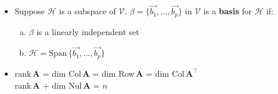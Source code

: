\documentclass[11pt]{article}
\newcommand{\Def}{\fbox{Def}}
\newcommand{\A}{\mathbf{A}}
\begin{document}
\begin{itemize}
\item[\Def] Suppose $\mathcal{H}$ is a subspace of $\mathcal{V}$. 
$\beta = \{\vec{b_1},...,\vec{b_p}\}$ in $\mathcal{V}$ is a \textbf{basis} for $\mathcal{H}$ if:
\begin{enumerate} [a)]
  \item $\beta$ is a linearly independent set
  \item $\mathcal{H} = \text{Span}\,\{\vec{b_1},...,\vec{b_p}\}$
\end{enumerate}

\item[\Def] rank\,$\A$ = dim Col\,$\A$ = dim Row\,$\A$ = dim Col\,$\A^\intercal$ \\
rank\,$\A$ + dim Nul\,$\A$ = $n$

\end{itemize}

\newpage
\end{document}
